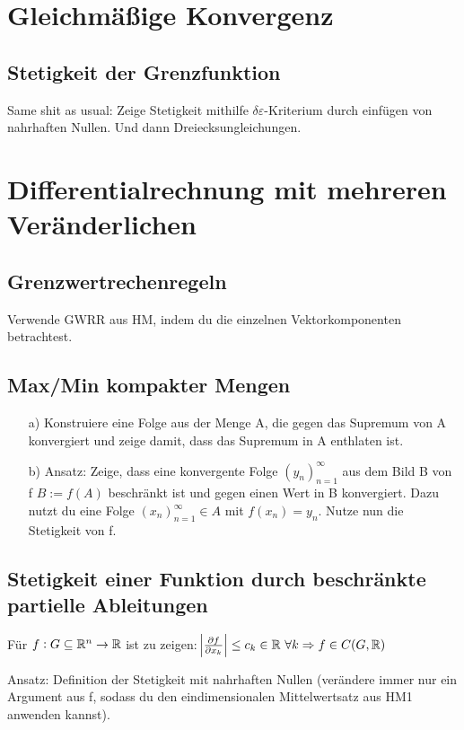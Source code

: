  \section{Gleichmäßige Konvergenz}

 \subsection{Stetigkeit der Grenzfunktion}
 Same shit as usual: Zeige Stetigkeit mithilfe $\delta\varepsilon$-Kriterium
 durch einfügen von nahrhaften Nullen. Und dann Dreiecksungleichungen.

 \section{Differentialrechnung mit mehreren Veränderlichen}
 \subsection{Grenzwertrechenregeln}
 Verwende GWRR aus HM, indem du die einzelnen Vektorkomponenten betrachtest.

 \subsection{Max/Min kompakter Mengen}
 \begin{itemize}
     \item[a)] Konstruiere eine Folge aus der Menge A, die gegen das Supremum von A
     konvergiert und zeige damit, dass das Supremum in A enthlaten ist.
     \item[b)] Ansatz: Zeige, dass eine konvergente Folge $(y_n)_{n=1}^\infty$ aus
     dem Bild B von f $B:=f(A)$ beschränkt ist und gegen einen Wert in B konvergiert.
     Dazu nutzt du eine Folge $(x_n)_{n=1}^\infty \in A$ mit $f(x_n) = y_n$. Nutze
     nun die Stetigkeit von f.

 \end{itemize}

 \subsection{Stetigkeit einer Funktion durch beschränkte partielle Ableitungen} \label{HM2:DiffTotAbl}
  Für $f:G\subseteq \mathbb{R}^n \rightarrow \mathbb{R}$ ist zu zeigen:
  $\abs{\frac{\partial f}{\partial x_k}} \leq c_k \in \mathbb{R} \ \forall k \Rightarrow f \in C(G,\mathbb{R})$

  Ansatz: Definition der Stetigkeit mit nahrhaften Nullen (verändere immer nur ein
  Argument aus f, sodass du den eindimensionalen Mittelwertsatz aus HM1 anwenden kannst).

